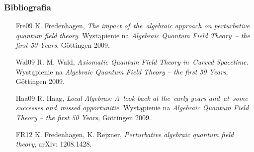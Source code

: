 \documentclass[10pt,t]{beamer}
\begin{document}
\begin{frame}
  \frametitle{Bibliografia}


  \begin{itemize}
    \RaggedRight

  \item [Fre09] K. Fredenhagen, \textit{The impact of~the~algebraic
      approach on perturbative quantum field theory}.
    Wystąpienie na \textit{Algebraic Quantum Field Theory~– the first 50
      Years}, G\"{o}ttingen 2009.

  \item [Wal09] R. M. Wald, \textit{Axiomatic Quantum Field Theory
    in~Curved Spacetime}. Wystąpienie na \textit{Algebraic
    Quantum Field Theory – the first 50 Years}, G\"{o}ttingen 2009.

  \item [Haa09] R. Haag, \textit{Local Algebras: A~look back at
      the~early years and~at~some successes and~missed opportunitie}.
    Wystąpienie na \textit{Algebraic Quantum Field Theory – the first 50
      Years}, G\"{o}ttingen 2009.

  \item [FR12] K. Fredenhagen, K. Rejzner, \textit{Perturbative
      algebraic quantum field theory}, arXiv: 1208.1428.

  \end{itemize}

\end{frame}
\end{document}
